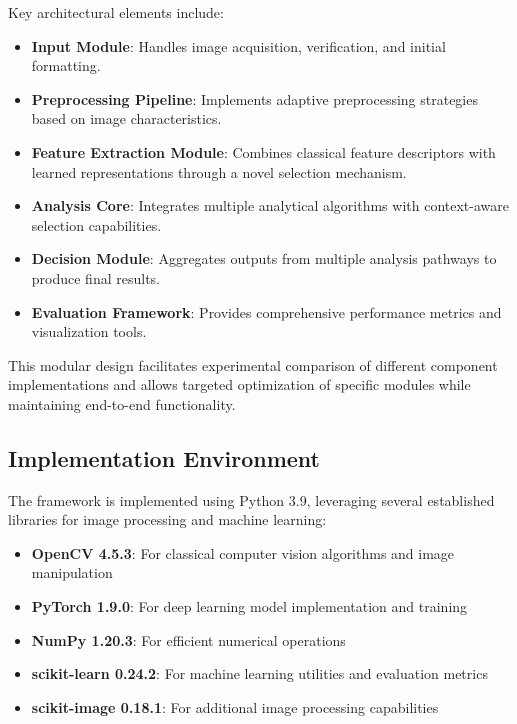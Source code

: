 
Key architectural elements include:

\begin{itemize}
    \item \textbf{Input Module}: Handles image acquisition, verification, and initial formatting.
    
    \item \textbf{Preprocessing Pipeline}: Implements adaptive preprocessing strategies based on image characteristics.
    
    \item \textbf{Feature Extraction Module}: Combines classical feature descriptors with learned representations through a novel selection mechanism.
    
    \item \textbf{Analysis Core}: Integrates multiple analytical algorithms with context-aware selection capabilities.
    
    \item \textbf{Decision Module}: Aggregates outputs from multiple analysis pathways to produce final results.
    
    \item \textbf{Evaluation Framework}: Provides comprehensive performance metrics and visualization tools.
\end{itemize}

This modular design facilitates experimental comparison of different component implementations and allows targeted optimization of specific modules while maintaining end-to-end functionality.

\subsection{Implementation Environment}
The framework is implemented using Python 3.9, leveraging several established libraries for image processing and machine learning:

\begin{itemize}
    \item \textbf{OpenCV 4.5.3}: For classical computer vision algorithms and image manipulation
    \item \textbf{PyTorch 1.9.0}: For deep learning model implementation and training
    \item \textbf{NumPy 1.20.3}: For efficient numerical operations
    \item \textbf{scikit-learn 0.24.2}: For machine learning utilities and evaluation metrics
    \item \textbf{scikit-image 0.18.1}: For additional image processing capabilities
\end{itemize}

